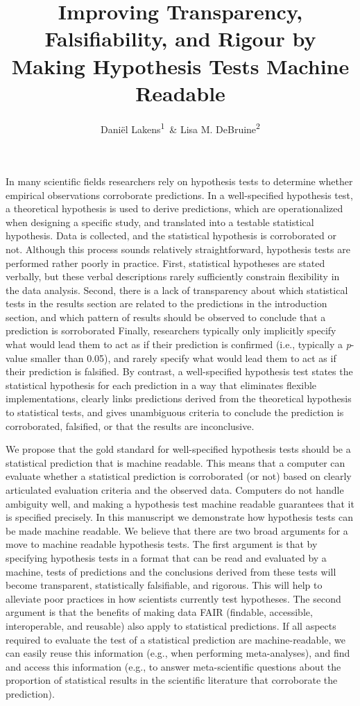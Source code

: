 \documentclass[doc,floatsintext]{apa6}
\title{Improving Transparency, Falsifiability, and Rigour by Making Hypothesis Tests Machine Readable}
\author{Daniël Lakens\textsuperscript{1}~\& Lisa M. DeBruine\textsuperscript{2}}
\date{}
\affiliation{
\vspace{0.5cm}
\textsuperscript{1} School of Innovation Sciences, Eindhoven University of Technology\\\textsuperscript{2} Institute of Neuroscience and Psychology, University of Glasgow}
\begin{document}
\maketitle

In many scientific fields researchers rely on hypothesis tests to determine whether empirical observations corroborate predictions. In a well-specified hypothesis test, a theoretical hypothesis is used to derive predictions, which are operationalized when designing a specific study, and translated into a testable statistical hypothesis. Data is collected, and the statistical hypothesis is corroborated or not. Although this process sounds relatively straightforward, hypothesis tests are performed rather poorly in practice. First, statistical hypotheses are stated verbally, but these verbal descriptions rarely sufficiently constrain flexibility in the data analysis. Second, there is a lack of transparency about which statistical tests in the results section are related to the predictions in the introduction section, and which pattern of results should be observed to conclude that a prediction is sorroborated Finally, researchers typically only implicitly specify what would lead them to act as if their prediction is confirmed (i.e., typically a \emph{p}-value smaller than 0.05), and rarely specify what would lead them to act as if their prediction is falsified. By contrast, a well-specified hypothesis test states the statistical hypothesis for each prediction in a way that eliminates flexible implementations, clearly links predictions derived from the theoretical hypothesis to statistical tests, and gives unambiguous criteria to conclude the prediction is corroborated, falsified, or that the results are inconclusive.

We propose that the gold standard for well-specified hypothesis tests should be a statistical prediction that is machine readable. This means that a computer can evaluate whether a statistical prediction is corroborated (or not) based on clearly articulated evaluation criteria and the observed data. Computers do not handle ambiguity well, and making a hypothesis test machine readable guarantees that it is specified precisely. In this manuscript we demonstrate how hypothesis tests can be made machine readable. We believe that there are two broad arguments for a move to machine readable hypothesis tests. The first argument is that by specifying hypothesis tests in a format that can be read and evaluated by a machine, tests of predictions and the conclusions derived from these tests will become transparent, statistically falsifiable, and rigorous. This will help to alleviate poor practices in how scientists currently test hypotheses. The second argument is that the benefits of making data FAIR (findable, accessible, interoperable, and reusable) also apply to statistical predictions. If all aspects required to evaluate the test of a statistical prediction are machine-readable, we can easily reuse this information (e.g., when performing meta-analyses), and find and access this information (e.g., to answer meta-scientific questions about the proportion of statistical results in the scientific literature that corroborate the prediction).
\end{document}
